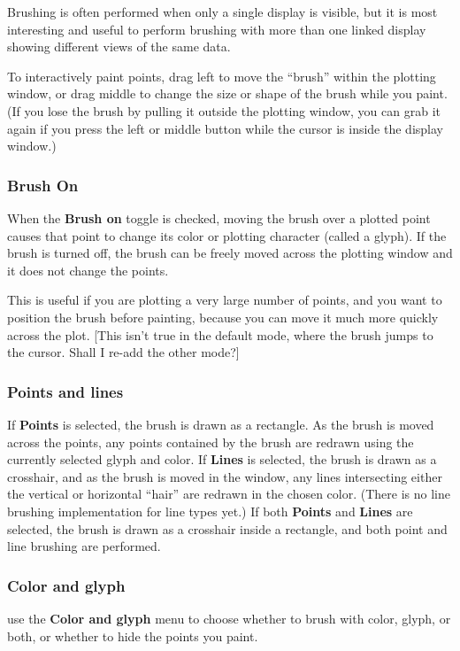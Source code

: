 \documentclass[11pt]{article}
\begin{document}
Brushing is often performed when only a single display is visible,
but it is most interesting and useful to perform brushing with more
than one linked display showing different views of the same data.  

To interactively paint points, drag left to move the ``brush'' within
the plotting window, or drag middle to change the size or shape of
the brush while you paint.  (If you lose the brush by pulling it
outside the plotting window, you can grab it again if you press the
left or middle button while the cursor is inside the display window.)

\subsubsection{Brush On}
%
When the {\bf Brush on} toggle is checked, moving the brush
over a plotted point causes that point to change its color or
plotting character (called a glyph).  If the brush is turned off, the
brush can be freely moved across the plotting window and it does not
change the points.  

This is useful if you are plotting a very large number of points,
and you want to position the brush before painting, because you
can move it much more quickly across the plot.  [This isn't true
in the default mode, where the brush jumps to the cursor.  Shall
I re-add the other mode?]

%
\subsubsection{Points and lines}
If {\bf Points} is selected, the brush is drawn as a rectangle.
As the brush is moved across the points, any points contained by
the brush are redrawn using the currently selected glyph and color.
If {\bf Lines} is selected, the brush is drawn as a crosshair, and
as the brush is moved in the window, any lines intersecting either
the vertical or horizontal ``hair'' are redrawn in the chosen color.
(There is no line brushing implementation for line types yet.)
If both {\bf Points} and {\bf Lines} are
selected, the brush is drawn as a crosshair inside a rectangle,
and both point and line brushing are performed.

\subsubsection{Color and glyph}
%
use the {\bf Color and glyph} menu to choose whether to brush
with color, glyph, or both, or whether to hide the points you
paint.
\end{document}
